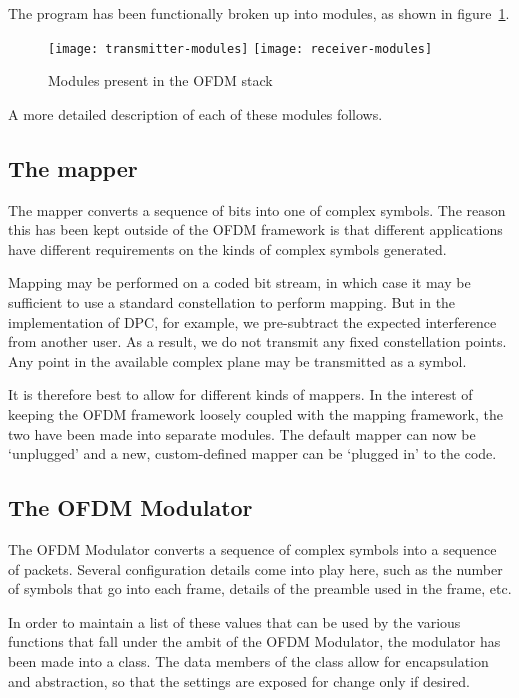 The program has been functionally broken up into modules, as shown in
figure~\ref{fig:modules}.

\begin{figure}[h]
	\centering
	\texttt{[image: transmitter-modules]}
	\texttt{[image: receiver-modules]}
	\caption{Modules present in the OFDM stack}
	\label{fig:modules}
\end{figure}

A more detailed description of each of these modules follows.

\subsection{The mapper}

The mapper converts a sequence of bits into one of complex symbols. The reason
this has been kept outside of the OFDM framework is that different applications
have different requirements on the kinds of complex symbols generated.

Mapping may be performed on a coded bit stream, in which case it may be
sufficient to use a standard constellation to perform mapping. But in the
implementation of DPC, for example, we pre-subtract the expected interference
from another user. As a result, we do not transmit any fixed constellation
points. Any point in the available complex plane may be transmitted as a
symbol.

It is therefore best to allow for different kinds of mappers. In the interest
of keeping the OFDM framework loosely coupled with the mapping framework, the
two have been made into separate modules. The default mapper can now be
`unplugged' and a new, custom-defined mapper can be `plugged in' to the code.

\subsection{The OFDM Modulator}
\label{subsec:ofdm-modulator}

The OFDM Modulator converts a sequence of complex symbols into a sequence of
packets. Several configuration details come into play here, such as the number
of symbols that go into each frame, details of the preamble used in the frame,
etc.

In order to maintain a list of these values that can be used by the various
functions that fall under the ambit of the OFDM Modulator, the modulator has
been made into a class. The data members of the class allow for encapsulation
and abstraction, so that the settings are exposed for change only if desired.

